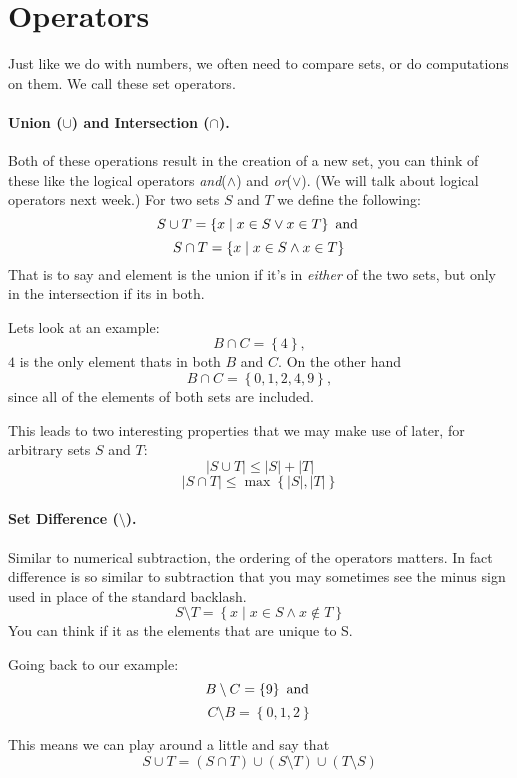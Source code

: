 \documentclass[11pt, oneside]{article}   	%
\begin{document}
\section{Operators}

Just like we do with numbers, we often need to compare sets, or do computations on them.
We call these set operators. 

\paragraph{Union ($\cup$) and Intersection ($\cap$).}
Both of these operations result in the creation of a new set, 
you can think of these like the logical operators \textit{and}($\wedge$) and \textit{or}($\vee$). (We will talk about logical operators next week.)
For two sets $S$ and $T$ we define the following: 
\[
S\cup T = \left\{x \mid x \in S \vee x \in T\right\} \textnormal{ and }
\]\[
S\cap T = \left\{x \mid x \in S \wedge x \in T\right\} \\
\]
That is to say and element is the union if it's in \textit{either} of the two sets, but only in the intersection if its in both. 

Lets look at an example:
\[
B \cap C = \left\{4\right\},
\]
$4$ is the only element thats in both $B$ and $C$. 
On the other hand 
\[
B \cap C = \left\{0,1,2,4,9\right\},
\]
since all of the elements of both sets are included. 

This leads to two interesting properties that we may make use of later, for arbitrary sets $S$ and $T$: 
\[
|S\cup T| \le  |S| + |T|
\]
\[
|S\cap T| \le \max\left\{|S|, |T|\right\}
\]

\paragraph{Set Difference ($\setminus$).}
Similar to numerical subtraction, the ordering of the operators matters. 
In fact difference is so similar to subtraction that you may sometimes see the minus sign used in place of the standard backlash. 
\[
S\setminus T  = \left\{x \mid x \in S \wedge x \notin T\right\} 
\]
You can think if it as the elements that are unique to S. 

Going back to our example:
\[
B \setminus C = \left\{9\right\}\textnormal{ and }
\] \[
C \setminus B = \left\{0,1,2\right\}
\]

This means we can play around a little and say that 
\[
S \cup T = \left(S \cap T\right) \cup \left(S \setminus T\right) \cup  \left(T \setminus S\right) 
\]
\end{document}
